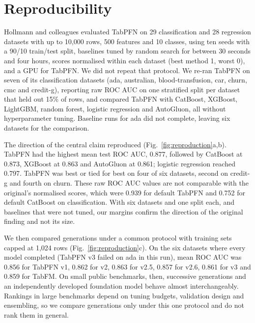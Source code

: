 \documentclass[11pt, a4paper, onecolumn, confidential, copyright]{hawkfranklin}
\begin{document}
\section*{Reproducibility}

Hollmann and colleagues evaluated TabPFN on 29 classification and 28 regression datasets with up to 10,000 rows, 500 features and 10 classes, using ten seeds with a 90/10 train/test split, baselines tuned by random search for between 30 seconds and four hours, scores normalised within each dataset (best method 1, worst 0), and a GPU for TabPFN.\citep{hollmann2025accurate} We did not repeat that protocol. We re-ran TabPFN on seven of its classification datasets (ada, australian, blood-transfusion, car, churn, cmc and credit-g), reporting raw ROC AUC on one stratified split per dataset that held out 15\% of rows, and compared TabPFN with CatBoost, XGBoost, LightGBM, random forest, logistic regression and AutoGluon, all without hyperparameter tuning. Baseline runs for ada did not complete, leaving six datasets for the comparison.

The direction of the central claim reproduced (Fig.~\ref{fig:reproduction}a,b). TabPFN had the highest mean test ROC AUC, 0.877, followed by CatBoost at 0.873, XGBoost at 0.863 and AutoGluon at 0.861; logistic regression reached 0.797. TabPFN was best or tied for best on four of six datasets, second on credit-g and fourth on churn. These raw ROC AUC values are not comparable with the original's normalised scores, which were 0.939 for default TabPFN and 0.752 for default CatBoost on classification.\citep{hollmann2025accurate} With six datasets and one split each, and baselines that were not tuned, our margins confirm the direction of the original finding and not its size.

We then compared generations under a common protocol with training sets capped at 1,024 rows (Fig.~\ref{fig:reproduction}c). On the six datasets where every model completed (TabPFN v3 failed on ada in this run), mean ROC AUC was 0.856 for TabPFN v1, 0.862 for v2, 0.863 for v2.5, 0.857 for v2.6, 0.861 for v3 and 0.859 for TabFM. On small public benchmarks, then, successive generations and an independently developed foundation model behave almost interchangeably. Rankings in large benchmarks depend on tuning budgets, validation design and ensembling,\citep{erickson2025tabarena,qu2025tabicl} so we compare generations only under this one protocol and do not rank them in general.
\end{document}
